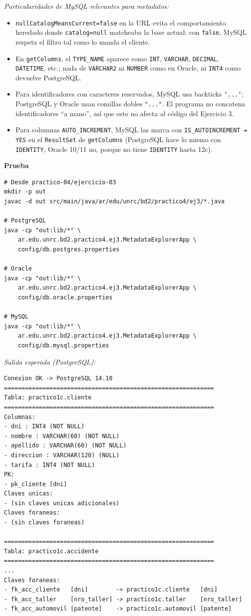 \documentclass[11pt,a4paper]{article}
\newcommand{\itemcabecera}[1]{\noindent\textbf{#1}\par\medskip}
\newcommand{\bloquePrueba}{\itemcabecera{Prueba}}
\begin{document}
\textit{Particularidades de MySQL relevantes para metadatos:}

\begin{itemize}
    \item \texttt{nullCatalogMeansCurrent=false} en la URL evita el comportamiento heredado donde \texttt{catalog=null} matcheaba la base actual: con \texttt{false}, MySQL respeta el filtro tal como lo manda el cliente.
    \item En \texttt{getColumns}, el \texttt{TYPE\_NAME} aparece como \texttt{INT}, \texttt{VARCHAR}, \texttt{DECIMAL}, \texttt{DATETIME}, etc.; nada de \texttt{VARCHAR2} ni \texttt{NUMBER} como en Oracle, ni \texttt{INT4} como devuelve PostgreSQL.
    \item Para identificadores con caracteres reservados, MySQL usa backticks \texttt{`...`}; PostgreSQL y Oracle usan comillas dobles \texttt{"..."}. El programa no concatena identificadores ``a mano'', así que esto no afecta al código del Ejercicio 3.
    \item Para columnas \texttt{AUTO\_INCREMENT}, MySQL las marca con \texttt{IS\_AUTOINCREMENT = YES} en el \texttt{ResultSet} de \texttt{getColumns} (PostgreSQL hace lo mismo con \texttt{IDENTITY}; Oracle 10/11 no, porque no tiene \texttt{IDENTITY} hasta 12c).
\end{itemize}

\bloquePrueba

\begin{lstlisting}[style=shellstyle]
# Desde practico-04/ejercicio-03
mkdir -p out
javac -d out src/main/java/ar/edu/unrc/bd2/practico4/ej3/*.java

# PostgreSQL
java -cp "out:lib/*" \
    ar.edu.unrc.bd2.practico4.ej3.MetadataExplorerApp \
    config/db.postgres.properties

# Oracle
java -cp "out:lib/*" \
    ar.edu.unrc.bd2.practico4.ej3.MetadataExplorerApp \
    config/db.oracle.properties

# MySQL
java -cp "out:lib/*" \
    ar.edu.unrc.bd2.practico4.ej3.MetadataExplorerApp \
    config/db.mysql.properties
\end{lstlisting}

\textit{Salida esperada (PostgreSQL):}

\begin{lstlisting}[style=shellstyle]
Conexion OK -> PostgreSQL 14.10
============================================================
Tabla: practico1c.cliente
============================================================
Columnas:
- dni : INT4 (NOT NULL)
- nombre : VARCHAR(60) (NOT NULL)
- apellido : VARCHAR(60) (NOT NULL)
- direccion : VARCHAR(120) (NULL)
- tarifa : INT4 (NOT NULL)
PK:
- pk_cliente [dni]
Claves unicas:
- (sin claves unicas adicionales)
Claves foraneas:
- (sin claves foraneas)

============================================================
Tabla: practico1c.accidente
============================================================
...
Claves foraneas:
- fk_acc_cliente   [dni]        -> practico1c.cliente   [dni]
- fk_acc_taller    [nro_taller] -> practico1c.taller    [nro_taller]
- fk_acc_automovil [patente]    -> practico1c.automovil [patente]
\end{lstlisting}
\end{document}

